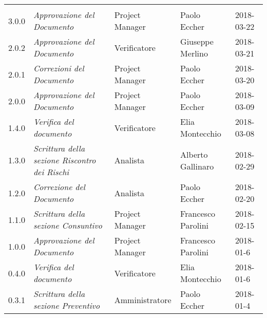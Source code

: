\newpage 
\section*{}
\begin{table}[H]
	\centering
	\begin{tabular}{C{2cm}|C{4cm}|C{3cm}|C{3cm}|R{2cm}}
		
		 & & & &  \\
		
		3.0.0 &\emph{Approvazione del Documento} & Project Manager & Paolo Eccher & 2018-03-22 \\
		\hline
		
		2.0.2 &\emph{Approvazione del Documento} & Verificatore & Giuseppe Merlino & 2018-03-21 \\
		\hline
		
		2.0.1 &\emph{Correzioni del Documento} & Project Manager & Paolo Eccher & 2018-03-20 \\
		\hline
		
		
		
		2.0.0 &\emph{Approvazione del Documento} & Project Manager & Paolo Eccher & 2018-03-09 \\
		\hline
		
		1.4.0 &\emph{Verifica del documento} & Verificatore & Elia Montecchio & 2018-03-08 \\
		\hline
		
		1.3.0 &\emph{Scrittura della sezione Riscontro dei Rischi} & Analista & Alberto Gallinaro & 2018-02-29 \\
		\hline

		1.2.0 &\emph{Correzione del Documento} & Analista & Paolo Eccher & 2018-02-20 \\
		\hline
		
		1.1.0 &\emph{Scrittura della sezione Consuntivo} & Project Manager & Francesco Parolini & 2018-02-15 \\
		\hline
		
		1.0.0 &\emph{Approvazione del Documento} & Project Manager & Francesco Parolini & 2018-01-6 \\
		\hline
		
		0.4.0 &\emph{Verifica del documento} & Verificatore & Elia Montecchio & 2018-01-6 \\
		\hline
		
		0.3.1 &\emph{Scrittura della sezione Preventivo} & Amministratore & Paolo Eccher  & 2018-01-4 \\
		\hline
		

\end{tabular}
\end{table}
